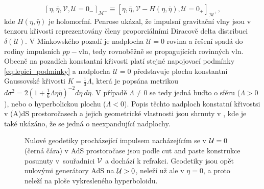 \begin{equation}
    \label{eq:lepici_podminky}
\left[\eta, \bar{\eta}, \mathcal{V}, \mathcal{U}=0_- \right]_{\mathcal{M}^-} \equiv 
\left[\eta, \bar{\eta}, \mathcal{V}-H\left(\eta, \bar{\eta}\right), \mathcal{U}=0_+  \right]_{\mathcal{M}^+},
\end{equation}
kde $H(\eta, \bar{\eta})$ je holomorfní. Penrose \cite{Penrose:1972xrn} ukázal, že impulsní gravitační vlny
jsou v tenzoru křivosti reprezentovány členy proporciálními Diracově delta distribuci $\delta(\mathcal{U})$.
V Minkowského pozadí je nadplocha $\mathcal{U}=0$ rovina a řešení spadá do rodiny impulsních $pp-$vln, tedy
rovnoběžně se propagujících rovinných vln. Obecně na pozadích konstantní křivosti platí stejné napojovací podmínky
\eqref{eq:lepici_podminky} a nadplocha $\mathcal{U}=0$ představuje plochu konstantní Gaussovské křivosti 
$K=\frac{1}{3}\Lambda$, která je popsána metrikou $d\sigma^2=2(1+\frac{1}{6}\Lambda \eta \bar{\eta})^{-2} 
d\eta~d\bar{\eta}$. V případě $\Lambda \neq 0$ se tedy jedná buďto o sféru
($\Lambda > 0$), nebo o hyperbolickou plochu ($\Lambda < 0$). Popis těchto nadploch konstatní křivostsi v (A)dS prostoročasech a
jejich geometrické vlastnosti jsou shrnuty v \cite{Podolsky:1997ri}, kde je také ukázáno,
že se jedná o neexpandující nadplochy.

\begin{figure}[H]
    \centering
    \caption{Nulové geodetiky procházející impulsem nacházejícím se v $\mathcal{U}=0$ (černá čára) v AdS prostoročase jsou podle cut and paste konstrukce posunuty
    v~souřadnici $\mathcal{V}$ a dochází k refrakci. Geodetiky jsou opět nulovými generátory AdS na $\mathcal{U} > 0$, neleží už ale v $\eta = 0$, a proto
    neleží na ploše vykresleného hyperboloidu.}
\end{figure}

